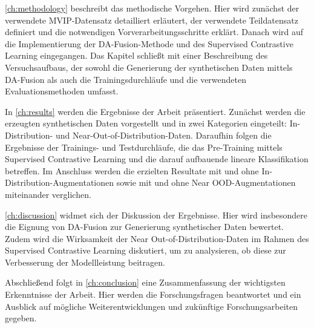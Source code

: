 \autoref{ch:methodology} beschreibt das methodische Vorgehen. Hier wird zunächst der verwendete MVIP-Datensatz detailliert erläutert, der verwendete Teildatensatz definiert und die notwendigen Vorverarbeitungsschritte erklärt. Danach wird auf die Implementierung der DA-Fusion-Methode und des Supervised Contrastive Learning eingegangen. Das Kapitel schließt mit einer Beschreibung des Versuchsaufbaus, der sowohl die Generierung der synthetischen Daten mittels DA-Fusion als auch die Trainingsdurchläufe und die verwendeten Evaluationsmethoden umfasst.

In \autoref{ch:results} werden die Ergebnisse der Arbeit präsentiert. Zunächst werden die erzeugten synthetischen Daten vorgestellt und in zwei Kategorien eingeteilt: In-Distribution- und Near-Out-of-Distribution-Daten. Daraufhin folgen die Ergebnisse der Trainings- und Testdurchläufe, die das Pre-Training mittels Supervised Contrastive Learning und die darauf aufbauende lineare Klassifikation betreffen. Im Anschluss werden die erzielten Resultate mit und ohne In-Distribution-Augmentationen sowie mit und ohne Near OOD-Augmentationen miteinander verglichen.

\autoref{ch:discussion} widmet sich der Diskussion der Ergebnisse. Hier wird insbesondere die Eignung von DA-Fusion zur Generierung synthetischer Daten bewertet. Zudem wird die Wirksamkeit der Near Out-of-Distribution-Daten im Rahmen des Supervised Contrastive Learning diskutiert, um zu analysieren, ob diese zur Verbesserung der Modellleistung beitragen.

Abschließend folgt in \autoref{ch:conclusion} eine Zusammenfassung der wichtigsten Erkenntnisse der Arbeit. Hier werden die Forschungsfragen beantwortet und ein Ausblick auf mögliche Weiterentwicklungen und zukünftige Forschungsarbeiten gegeben.